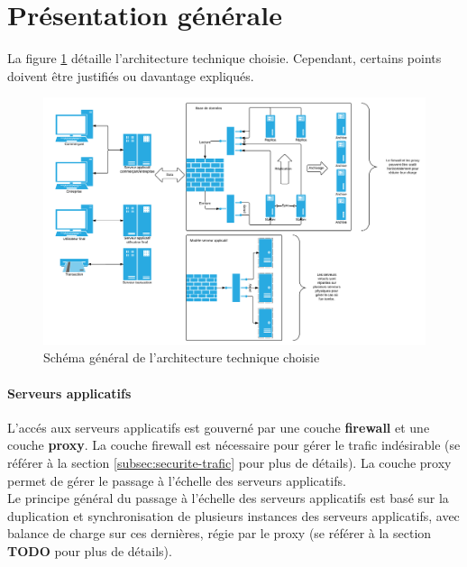 




\section{Présentation générale}

La figure \ref{fig:network} détaille l'architecture technique choisie.
Cependant, certains points doivent être justifiés ou davantage expliqués.

\begin{figure}[htpb]
    \centering
    \includegraphics[width=\textwidth]{network}
    \caption{Schéma général de l'architecture technique choisie}
    \label{fig:network}
\end{figure}

\paragraph{Serveurs applicatifs}

L'accés aux serveurs applicatifs est gouverné par une couche \textbf{firewall}
et une couche \textbf{proxy}. La couche firewall est nécessaire pour gérer le
trafic indésirable (se référer à la section
\ref{subsec:securite-trafic} pour plus de détails). La couche proxy
permet de gérer le passage à l'échelle des serveurs applicatifs. \\

Le principe général du passage à l'échelle des serveurs applicatifs est basé
sur la duplication et synchronisation de plusieurs instances des serveurs
applicatifs, avec balance de charge sur ces dernières, régie par le proxy (se
référer à la section {\huge \textbf{TODO} } pour plus de détails).

